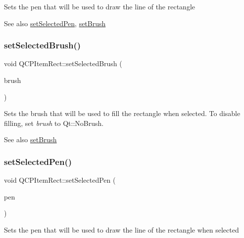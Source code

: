 Sets the pen that will be used to draw the line of the rectangle

\begin{DoxySeeAlso}{See also}
\mbox{\hyperlink{class_q_c_p_item_rect_a52a1bcb2dc753a538e406a2ba3cf21ce}{set\+Selected\+Pen}}, \mbox{\hyperlink{class_q_c_p_item_rect_abbd4e346a03513ee466afc25d9c75446}{set\+Brush}} 
\end{DoxySeeAlso}
\mbox{\label{class_q_c_p_item_rect_abd1792859844118dedee86223cede7af}} 
\subsubsection{\texorpdfstring{set\+Selected\+Brush()}{setSelectedBrush()}}
{\footnotesize\ttfamily void Q\+C\+P\+Item\+Rect\+::set\+Selected\+Brush (\begin{DoxyParamCaption}\item[{const Q\+Brush \&}]{brush }\end{DoxyParamCaption})}

Sets the brush that will be used to fill the rectangle when selected. To disable filling, set {\itshape brush} to Qt\+::\+No\+Brush.

\begin{DoxySeeAlso}{See also}
\mbox{\hyperlink{class_q_c_p_item_rect_abbd4e346a03513ee466afc25d9c75446}{set\+Brush}} 
\end{DoxySeeAlso}
\mbox{\label{class_q_c_p_item_rect_a52a1bcb2dc753a538e406a2ba3cf21ce}} 
\subsubsection{\texorpdfstring{set\+Selected\+Pen()}{setSelectedPen()}}
{\footnotesize\ttfamily void Q\+C\+P\+Item\+Rect\+::set\+Selected\+Pen (\begin{DoxyParamCaption}\item[{const Q\+Pen \&}]{pen }\end{DoxyParamCaption})}

Sets the pen that will be used to draw the line of the rectangle when selected

